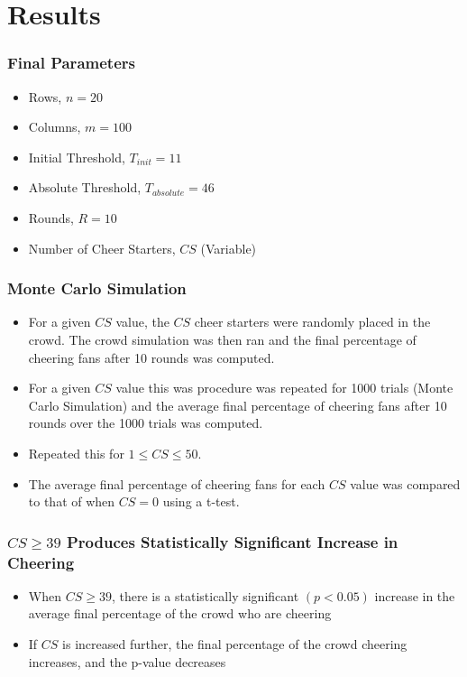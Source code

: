 \documentclass[compress,handout,10pt]{beamer}
\let\olditem\item
\renewcommand{\item}{\setlength{\itemsep}{0.5\baselineskip}\olditem}
\begin{document}
\section{Results}

\begin{frame}
	\frametitle{Final Parameters}
	\begin{itemize}
		\item Rows, $n=20$
		\item Columns, $m=100$
		\item Initial Threshold, $T_{init}=11$
		\item Absolute Threshold, $T_{absolute}=46$
		\item Rounds, $R=10$
		\item Number of Cheer Starters, $CS$ (Variable)
	\end{itemize}
\end{frame}

\begin{frame}
	\frametitle{Monte Carlo Simulation}
	\begin{itemize}
		\item For a given $CS$ value, the $CS$ cheer starters were randomly placed in the crowd. The crowd simulation was then ran and the final percentage of cheering fans after 10 rounds was computed.
		\item For a given $CS$ value this was procedure was repeated for 1000 trials (Monte Carlo Simulation) and the average final percentage of cheering fans after 10 rounds over the 1000 trials was computed. 
		\item Repeated this for $1 \leq CS \leq 50$.
		\item The average final percentage of cheering fans for each $CS$ value was compared to that of when $CS=0$ using a t-test. 
	\end{itemize}
\end{frame}

\begin{frame}
	\frametitle{$CS\geq 39$ Produces Statistically Significant Increase in Cheering}
	\begin{itemize}
		\item When $CS\geq39$, there is a statistically significant $(p<0.05)$ increase in the average final percentage of the crowd who are cheering
		\item If $CS$ is increased further, the final percentage of the crowd cheering increases, and the p-value decreases
	\end{itemize}
\end{frame}
\end{document}
